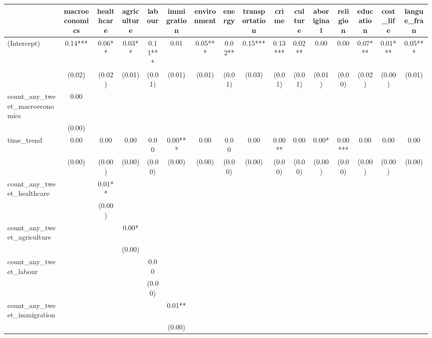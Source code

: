 \begin{table}
\centering
\begin{tabular}[t]{lccccccccccccccc}
\toprule
  & macroeconomics & healthcare & agriculture & labour & immigration & environment & energy & transportation & crime & culture & aboriginal & religion & education & cost\_life & langue\_fran\\
\midrule
(Intercept) & \num{0.14}*** & \num{0.06}** & \num{0.03}** & \num{0.11}*** & \num{0.01} & \num{0.05}*** & \num{0.02}** & \num{0.15}*** & \num{0.13}*** & \num{0.02}** & \num{0.00} & \num{0.00} & \num{0.07}*** & \num{0.01}*** & \num{0.05}***\\
 & (\num{0.02}) & (\num{0.02}) & (\num{0.01}) & (\num{0.01}) & (\num{0.01}) & (\num{0.01}) & (\num{0.01}) & (\num{0.03}) & (\num{0.01}) & (\num{0.01}) & (\num{0.01}) & (\num{0.00}) & (\num{0.02}) & (\num{0.00}) & (\num{0.01})\\
count\_any\_tweet\_macroeconomics & \num{0.00} &  &  &  &  &  &  &  &  &  &  &  &  &  & \\
 & (\num{0.00}) &  &  &  &  &  &  &  &  &  &  &  &  &  & \\
time\_trend & \num{0.00} & \num{0.00} & \num{0.00} & \num{0.00} & \num{0.00}*** & \num{0.00} & \num{0.00} & \num{0.00} & \num{0.00}** & \num{0.00} & \num{0.00}* & \num{0.00}*** & \num{0.00} & \num{0.00} & \num{0.00}\\
 & (\num{0.00}) & (\num{0.00}) & (\num{0.00}) & (\num{0.00}) & (\num{0.00}) & (\num{0.00}) & (\num{0.00}) & (\num{0.00}) & (\num{0.00}) & (\num{0.00}) & (\num{0.00}) & (\num{0.00}) & (\num{0.00}) & (\num{0.00}) & (\num{0.00})\\
count\_any\_tweet\_healthcare &  & \num{0.01}** &  &  &  &  &  &  &  &  &  &  &  &  & \\
 &  & (\num{0.00}) &  &  &  &  &  &  &  &  &  &  &  &  & \\
count\_any\_tweet\_agriculture &  &  & \num{0.00}* &  &  &  &  &  &  &  &  &  &  &  & \\
 &  &  & (\num{0.00}) &  &  &  &  &  &  &  &  &  &  &  & \\
count\_any\_tweet\_labour &  &  &  & \num{0.00} &  &  &  &  &  &  &  &  &  &  & \\
 &  &  &  & (\num{0.00}) &  &  &  &  &  &  &  &  &  &  & \\
count\_any\_tweet\_immigration &  &  &  &  & \num{0.01}** &  &  &  &  &  &  &  &  &  & \\
 &  &  &  &  & (\num{0.00}) &  &  &  &  &  &  &  &  &  & \\

\end{tabular}
\end{table}
